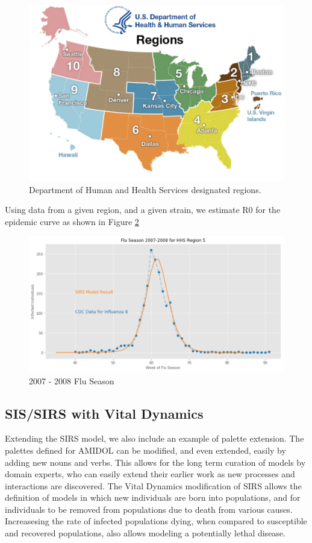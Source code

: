 \documentclass[11pt]{article}
\newcommand{\amidol}{\textsc{AMIDOL}}
\begin{document}
\begin{figure}
\includegraphics[width=\textwidth]{figs/regionsmap.pdf}
\caption{Department of Human and Health Services designated regions.}
\label{Fig:Regions}
\end{figure}

Using data from a given region, and a given strain, we estimate R0 for the epidemic curve as shown in Figure \ref{Fig:R0}

\begin{figure}
\includegraphics[width=\textwidth]{figs/2007-2008-SIRS.pdf}
\caption{2007 - 2008 Flu Season}
\label{Fig:R0}
\end{figure}

\subsection{SIS/SIRS with Vital Dynamics}

Extending the SIRS model, we also include an example of palette extension.  The palettes defined for \amidol{} can be modified, and even extended, easily by adding new nouns and verbs.  This allows for the long term curation of models by domain experts, who can easily extend their earlier work as new processes and interactions are discovered.  The Vital Dynamics modification of SIRS allows the definition of models in which new individuals are born into populations, and for individuals to be removed from populations due to death from various causes.  Increasesing the rate of infected populations dying, when compared to susceptible and recovered populations, also allows modeling a potentially lethal disease.
\end{document}
